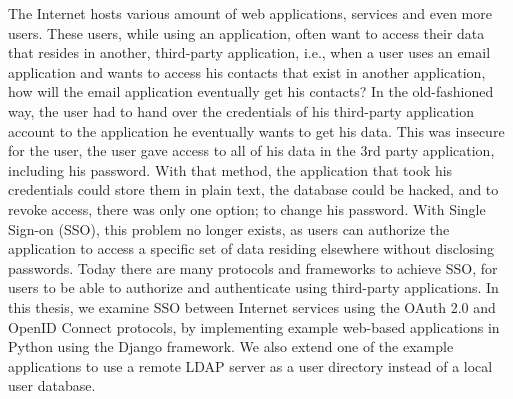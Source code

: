 
The Internet hosts various amount of web applications, services and even more users.
These users, while using an application, often want to access their data that resides in another, third-party application, i.e., when a user uses an email application and wants to access his contacts that exist in another application, how will the email application eventually get his contacts?
In the old-fashioned way, the user had to hand over the credentials of his third-party application account to the application he eventually wants to get his data.
This was insecure for the user, the user gave access to all of his data in the 3rd party application, including his password.
With that method, the application that took his credentials could store them in plain text, the database could be hacked, and to revoke access, there was only one option; to change his password. With Single Sign-on (SSO), this problem no longer exists, as users can authorize the application to access a specific set of data residing elsewhere without disclosing passwords.
Today there are many protocols and frameworks to achieve SSO, for users to be able to authorize and authenticate using third-party applications.
In this thesis, we examine SSO between Internet services using the OAuth 2.0 and OpenID Connect protocols, by implementing example web-based applications in Python using the Django framework. We also extend one of the example applications to use a remote LDAP server as a user directory instead of a local user database.
